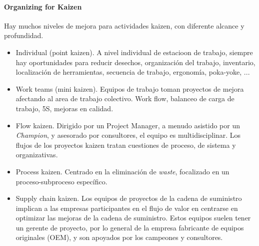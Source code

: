 \documentclass[]{article}
\begin{document}
\paragraph{Organizing for Kaizen}

Hay muchos niveles de mejora para actividades kaizen, con diferente alcance y profundidad.
\begin{itemize}
	\item Individual (point kaizen). A nivel individual de estacioon de trabajo, siempre hay oportunidades para reducir desechos, organización del trabajo, inventario, localización de herramientas, secuencia de trabajo, ergonomía, poka-yoke, ...
	\item Work teams (mini kaizen). Equipos de trabajo toman proyectos de mejora afectando al area de trabajo colectivo. Work flow, balanceo de carga de trabajo, 5S, mejoras en calidad.
	\item Flow kaizen. Dirigido por un Project Manager, a menudo asistido por un \textit{Champion}, y asesorado por consultores, el equipo es multidisciplinar. Los flujos de los proyectos kaizen tratan cuestiones de proceso, de sistema y organizativas. 
	\item Process kaizen. Centrado en la eliminación de \textit{waste}, focalizado en un proceso-subproceso específico.
	\item Supply chain kaizen. Los equipos de proyectos de la cadena de suministro implican a las empresas participantes en el flujo de valor en centrarse en optimizar las mejoras de la cadena de suministro. Estos equipos suelen tener un gerente de proyecto, por lo general de la empresa fabricante de equipos originales (OEM), y son apoyados por los campeones y consultores.
\end{itemize}
\end{document}
